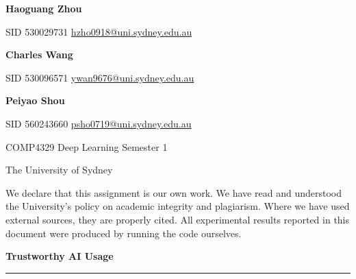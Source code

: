 \documentclass[10pt]{article}
\begin{document}
\vspace{1.5cm}

\begin{center}
{\large\bfseries Haoguang Zhou}\par\smallskip
{\small SID 530029731 \quad\textbar\quad \href{mailto:hzho0918@uni.sydney.edu.au}{hzho0918@uni.sydney.edu.au}}

\vspace{0.8em}

{\large\bfseries Charles Wang}\par\smallskip
{\small SID 530096571 \quad\textbar\quad \href{mailto:ywan9676@uni.sydney.edu.au}{ywan9676@uni.sydney.edu.au}}

\vspace{0.8em}

{\large\bfseries Peiyao Shou}\par\smallskip
{\small SID 560243660 \quad\textbar\quad \href{mailto:psho0719@uni.sydney.edu.au}{psho0719@uni.sydney.edu.au}}
\end{center}

\vspace{1.0cm}

\begin{center}
{\small COMP4329 Deep Learning \quad\textbar{} Semester 1\par
The University of Sydney}
\end{center}

\vspace{2.0cm}

\noindent We declare that this assignment is our own work. We have read and understood the University's policy on academic integrity and plagiarism. Where we have used external sources, they are properly cited. All experimental results reported in this document were produced by running the code ourselves.

\newpage

\thispagestyle{fancy}
\vspace*{0.5cm}
\begin{center}
{\bfseries\fontsize{18}{22}\selectfont Trustworthy AI Usage\par}
\vspace{0.5em}
{\color{SectionRule}\rule{0.5\linewidth}{0.6pt}\par}
\end{center}
\end{document}
